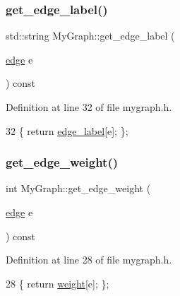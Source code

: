 \subsubsection{\texorpdfstring{get\+\_\+edge\+\_\+label()}{get\_edge\_label()}}
{\footnotesize\ttfamily std\+::string My\+Graph\+::get\+\_\+edge\+\_\+label (\begin{DoxyParamCaption}\item[{\mbox{\hyperlink{classedge}{edge}}}]{e }\end{DoxyParamCaption}) const\hspace{0.3cm}{\ttfamily [inline]}}



Definition at line 32 of file mygraph.\+h.


\begin{DoxyCode}
32 \{ \textcolor{keywordflow}{return} \mbox{\hyperlink{class_my_graph_ac87b3f22352ddc7ec3864173a0d69cdd}{edge\_label}}[e]; \};
\end{DoxyCode}
\mbox{\label{class_my_graph_aed4da227ae0cfe5565fa23acb4c4776c}} 
\subsubsection{\texorpdfstring{get\+\_\+edge\+\_\+weight()}{get\_edge\_weight()}}
{\footnotesize\ttfamily int My\+Graph\+::get\+\_\+edge\+\_\+weight (\begin{DoxyParamCaption}\item[{\mbox{\hyperlink{classedge}{edge}}}]{e }\end{DoxyParamCaption}) const\hspace{0.3cm}{\ttfamily [inline]}}



Definition at line 28 of file mygraph.\+h.


\begin{DoxyCode}
28 \{ \textcolor{keywordflow}{return} \mbox{\hyperlink{class_my_graph_aa6e12f16153220780e9db1eb30112b34}{weight}}[e]; \};    
\end{DoxyCode}
\mbox{\label{class_my_graph_ab92ebd7632157e681a6a7d7873841de7}} 
